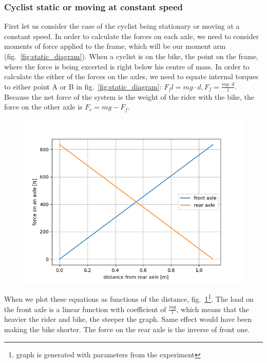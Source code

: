 \documentclass[12pt]{article}
\begin{document}
\subsubsection{Cyclist static or moving at constant speed}
First let us consider the case of the cyclist being stationary or moving at a constant speed. In order to 
calculate the forces on each axle, we need to consider moments of force applied to the frame, which will be
our moment arm (fig.~\ref{fig:static_diagram}). When a cyclist is on the bike, the point on the frame, where
the force is being excerted is right below his centre of mass. In order to calculate the either of the forces 
on the axles, we need to equate internal torques to either point A or B in fig.~\ref{fig:static_diagram}: 
\emph{$F_f l = mg \cdot d, F_f = \frac{mg \cdot d}{l}$}. Because the net force of the system is the weight
of the rider with the bike, the force on the other axle is \emph{$F_r = mg - F_f$}. \\
\begin{figure}[H]
\includegraphics[width=\linewidth]{axles_static_graph}
\label{fig:static_graph}%
\end{figure}
When we plot these equations as functions of the distance, fig.~\ref{fig:static_graph}\footnote[1]{graph is 
generated with parameters from the experiment}. The load on the front axle is a linear function with 
coefficient of $\frac{mg}{l}$, which means that the heavier the rider and bike, the steeper the graph.
Same effect would have been making the bike shorter. The force on the rear axle is the inverse of front one.
\end{document}
